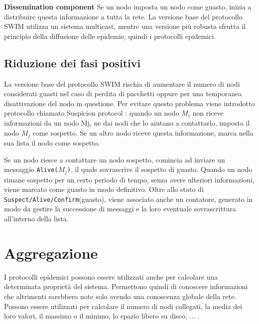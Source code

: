 \textbf{Dissemination component} Se un nodo imposta un nodo come guasto, inizia a distribuire questa informazione a tutta la rete. La versione base del protocollo SWIM utilizza un sistema multicast, mentre una versione più robusta sfrutta il principio della diffusione delle epidemie, quindi i protocolli epidemici.
\subsection{Riduzione dei fasi positivi}
La versione base del protocollo SWIM rischia di aumentare il numero di nodi considerati guasti nel caso di perdita di pacchetti oppure per una temporanea disattivazione del nodo in questione. Per evitare questo problema viene introdotto protocollo  chiamato Suspicion protocol \cite{swim}: quando un nodo $M_i$ non riceve informazioni da un nodo Mj, ne dai nodi che lo aiutano a contattarlo, imposta il nodo $M_j$ come sospetto. Se un altro nodo riceve questa informazione, marca nella sua lista il nodo come sospetto.

Se un nodo riesce a contattare un nodo sospetto, comincia ad inviare un messaggio \texttt{Alive($M_j$)}, il quale sovrascrive il sospetto di guasto. Quando un nodo rimane sospetto per un certo periodo di tempo, senza avere ulteriori informazioni, viene marcato come guasto in modo definitivo. Oltre allo stato di \texttt{Suspect/Alive/Confirm}(guasto), viene associato anche un contatore, generato in modo da gestire la successione di messaggi e la loro eventuale sovrascrittura all’interno della lista.

\section{Aggregazione}
I protocolli epidemici possono essere utilizzati anche per calcolare una determinata proprietà del sistema. Permettono quindi di conoscere informazioni che altrimenti sarebbero note solo avendo una conoscenza globale della rete. Possono essere utilizzati per calcolare il numero di nodi collegati, la media dei loro valori, il massimo o il minimo, lo spazio libero su disco, ... \cite{montresor}.

